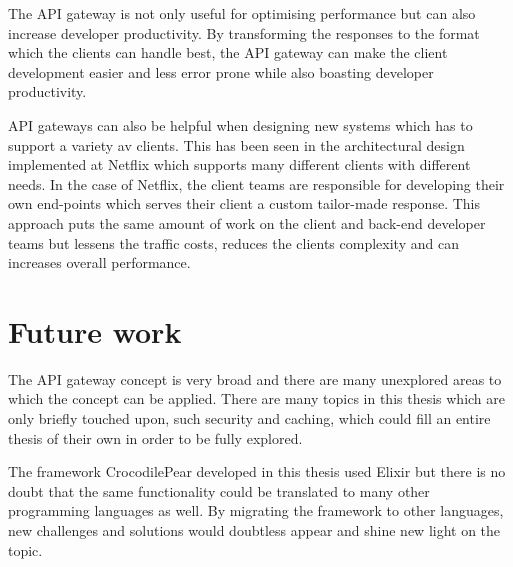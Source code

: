 \documentclass{cslthse-msc}
\begin{document}
The API gateway is not only useful for optimising performance but can also increase developer productivity. By transforming the responses to the format which the clients can handle best, the API gateway can make the client development easier and less error prone while also boasting developer productivity.

API gateways can also be helpful when designing new systems which has to support a variety av clients. This has been seen in the architectural design implemented at Netflix\cite{netflix} which supports many different clients with different needs. In the case of Netflix, the client teams are responsible for developing their own end-points which serves their client a custom tailor-made response. This approach puts the same amount of work on the client and back-end developer teams but lessens the traffic costs, reduces the clients complexity and can increases overall performance.

\section{Future work}

The API gateway concept is very broad and there are many unexplored areas to which the concept can be applied. There are many topics in this thesis which are only briefly touched upon, such security and caching, which could fill an entire thesis of their own in order to be fully explored.

The framework CrocodilePear developed in this thesis used Elixir but there is no doubt that the same functionality could be translated to many other programming languages as well. By migrating the framework to other languages, new challenges and solutions would doubtless appear and shine new light on the topic. 

\cleardoublepage
{}
{}


\end{document}
